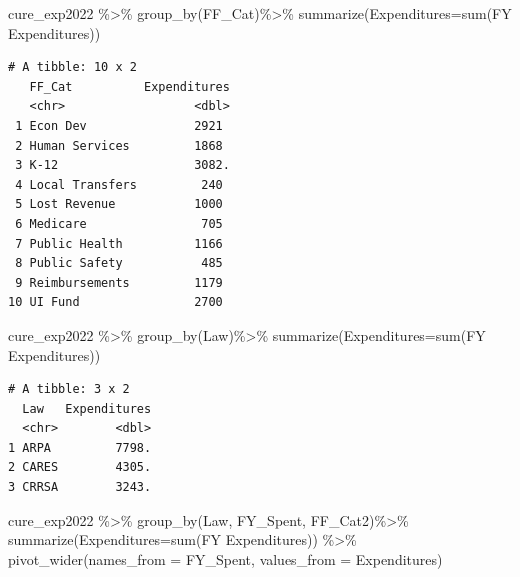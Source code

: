\documentclass[
  letterpaper,
  DIV=11,
  numbers=noendperiod]{scrreport}
\newenvironment{Shaded}{\begin{snugshade}}{\end{snugshade}}
\newcommand{\AttributeTok}[1]{\textcolor[rgb]{0.40,0.45,0.13}{#1}}
\newcommand{\FunctionTok}[1]{\textcolor[rgb]{0.28,0.35,0.67}{#1}}
\newcommand{\NormalTok}[1]{\textcolor[rgb]{0.00,0.23,0.31}{#1}}
\newcommand{\SpecialCharTok}[1]{\textcolor[rgb]{0.37,0.37,0.37}{#1}}
\newcommand{\StringTok}[1]{\textcolor[rgb]{0.13,0.47,0.30}{#1}}
\begin{document}
\begin{Shaded}
\begin{Highlighting}[]
\NormalTok{cure\_exp2022 }\SpecialCharTok{\%\textgreater{}\%} 
  \FunctionTok{group\_by}\NormalTok{(}\StringTok{\textasciigrave{}}\AttributeTok{FF\_Cat}\StringTok{\textasciigrave{}}\NormalTok{)}\SpecialCharTok{\%\textgreater{}\%} 
  \FunctionTok{summarize}\NormalTok{(}\AttributeTok{Expenditures=}\FunctionTok{sum}\NormalTok{(}\StringTok{\textasciigrave{}}\AttributeTok{FY Expenditures}\StringTok{\textasciigrave{}}\NormalTok{))}
\end{Highlighting}
\end{Shaded}

\begin{verbatim}
# A tibble: 10 x 2
   FF_Cat          Expenditures
   <chr>                  <dbl>
 1 Econ Dev               2921 
 2 Human Services         1868 
 3 K-12                   3082.
 4 Local Transfers         240 
 5 Lost Revenue           1000 
 6 Medicare                705 
 7 Public Health          1166 
 8 Public Safety           485 
 9 Reimbursements         1179 
10 UI Fund                2700 
\end{verbatim}

\begin{Shaded}
\begin{Highlighting}[]
\NormalTok{cure\_exp2022 }\SpecialCharTok{\%\textgreater{}\%} 
  \FunctionTok{group\_by}\NormalTok{(Law)}\SpecialCharTok{\%\textgreater{}\%} 
  \FunctionTok{summarize}\NormalTok{(}\AttributeTok{Expenditures=}\FunctionTok{sum}\NormalTok{(}\StringTok{\textasciigrave{}}\AttributeTok{FY Expenditures}\StringTok{\textasciigrave{}}\NormalTok{))}
\end{Highlighting}
\end{Shaded}

\begin{verbatim}
# A tibble: 3 x 2
  Law   Expenditures
  <chr>        <dbl>
1 ARPA         7798.
2 CARES        4305.
3 CRRSA        3243.
\end{verbatim}

\begin{Shaded}
\begin{Highlighting}[]
\NormalTok{cure\_exp2022 }\SpecialCharTok{\%\textgreater{}\%} 
  \FunctionTok{group\_by}\NormalTok{(Law, FY\_Spent, FF\_Cat2)}\SpecialCharTok{\%\textgreater{}\%} 
  \FunctionTok{summarize}\NormalTok{(}\AttributeTok{Expenditures=}\FunctionTok{sum}\NormalTok{(}\StringTok{\textasciigrave{}}\AttributeTok{FY Expenditures}\StringTok{\textasciigrave{}}\NormalTok{)) }\SpecialCharTok{\%\textgreater{}\%}
  \FunctionTok{pivot\_wider}\NormalTok{(}\AttributeTok{names\_from =}\NormalTok{ FY\_Spent, }\AttributeTok{values\_from =}\NormalTok{ Expenditures) }
\end{Highlighting}
\end{Shaded}
\end{document}
